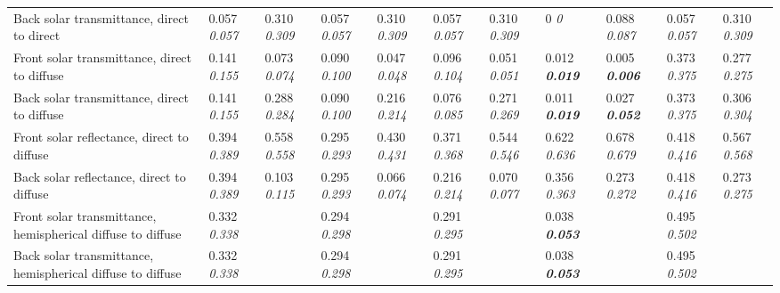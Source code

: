 \begin{longtable}[c]{p{1.0in}p{0.4in}p{0.4in}p{0.4in}p{0.4in}p{0.4in}p{0.4in}p{0.4in}p{0.4in}p{0.4in}p{0.4in}}
Back solar transmittance, direct to direct & 0.057 \quad \quad \textit{0.057} & 0.310 \quad \quad \textit{0.309} & 0.057 \quad \quad \textit{0.057} & 0.310 \quad \quad \textit{0.309} & 0.057 \quad \quad \textit{0.057} & 0.310 \quad \quad \textit{0.309} & 0 \quad \quad \textit{0} & 0.088 \quad \quad \textit{0.087} & 0.057 \quad \quad \textit{0.057} & 0.310 \quad \quad \textit{0.309} \tabularnewline
Front solar transmittance, direct to diffuse & 0.141 \quad \quad \textit{0.155} & 0.073 \quad \quad \textit{0.074} & 0.090 \quad \quad \textit{0.100} & 0.047 \quad \quad \textit{0.048} & 0.096 \quad \quad \textit{0.104} & 0.051 \quad \quad \textit{0.051} & 0.012 \quad \quad \textbf{\textit{0.019}} & 0.005 \quad \quad \textbf{\textit{0.006}} & 0.373 \quad \quad \textit{0.375} & 0.277 \quad \quad \textit{0.275} \tabularnewline
Back solar transmittance, direct to diffuse & 0.141 \quad \quad \textit{0.155} & 0.288 \quad \quad \textit{0.284} & 0.090 \quad \quad \textit{0.100} & 0.216 \quad \quad \textit{0.214} & 0.076 \quad \quad \textit{0.085} & 0.271 \quad \quad \textit{0.269} & 0.011 \quad \quad \textbf{\textit{0.019}} & 0.027 \quad \quad \textbf{\textit{0.052}} & 0.373 \quad \quad \textit{0.375} & 0.306 \quad \quad \textit{0.304} \tabularnewline
Front solar reflectance, direct to diffuse & 0.394 \quad \quad \textit{0.389} & 0.558 \quad \quad \textit{0.558} & 0.295 \quad \quad \textit{0.293} & 0.430 \quad \quad \textit{0.431} & 0.371 \quad \quad \textit{0.368} & 0.544 \quad \quad \textit{0.546} & 0.622 \quad \quad \textit{0.636} & 0.678 \quad \quad \textit{0.679} & 0.418 \quad \quad \textit{0.416} & 0.567 \quad \quad \textit{0.568} \tabularnewline
Back solar reflectance, direct to diffuse & 0.394 \quad \quad \textit{0.389} & 0.103 \quad \quad \textit{0.115} & 0.295 \quad \quad \textit{0.293} & 0.066 \quad \quad \textit{0.074} & 0.216 \quad \quad \textit{0.214} & 0.070 \quad \quad \textit{0.077} & 0.356 \quad \quad \textit{0.363} & 0.273 \quad \quad \textit{0.272} & 0.418 \quad \quad \textit{0.416} & 0.273 \quad \quad \textit{0.275} \tabularnewline
Front solar transmittance, hemispherical diffuse to diffuse & 0.332 \quad \quad \textit{0.338} &  & 0.294 \quad \quad \textit{0.298} &  & 0.291 \quad \quad \textit{0.295} &  & 0.038 \quad \quad \textbf{\textit{0.053}} &  & 0.495 \quad \quad \textit{0.502} \tabularnewline
Back solar transmittance, hemispherical diffuse to diffuse & 0.332 \quad \quad \textit{0.338} &  & 0.294 \quad \quad \textit{0.298} &  & 0.291 \quad \quad \textit{0.295} &  & 0.038 \quad \quad \textbf{\textit{0.053}} &  & 0.495 \quad \quad \textit{0.502} &  \tabularnewline

\end{longtable}
